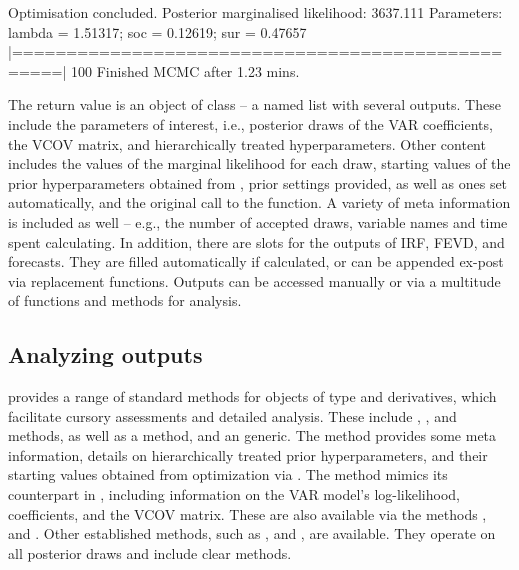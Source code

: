 \documentclass[article,nojss]{jss} %
\begin{document}
\begin{Soutput}
Optimisation concluded.
Posterior marginalised likelihood: 3637.111
Parameters: lambda = 1.51317; soc = 0.12619; sur = 0.47657
  |==================================================| 100%
Finished MCMC after 1.23 mins.
\end{Soutput}

The return value is an object of class  -- a named list with several outputs. These include the parameters of interest, i.e., posterior draws of the VAR coefficients, the VCOV matrix, and hierarchically treated hyperparameters.
Other content includes the values of the marginal likelihood for each draw, starting values of the prior hyperparameters obtained from , prior settings provided, as well as ones set automatically, and the original call to the  function.
A variety of meta information is included as well -- e.g., the number of accepted draws, variable names and time spent calculating.
In addition, there are slots for the outputs of IRF, FEVD, and forecasts. They are filled automatically if calculated, or can be appended ex-post via replacement functions.
Outputs can be accessed manually or via a multitude of functions and methods for analysis.

\subsection{Analyzing outputs}\label{subsec:assess}

 provides a range of standard methods for objects of type  and derivatives, which facilitate cursory assessments and detailed analysis. These include , , and  methods, as well as a  method, and an  generic.
The  method provides some meta information, details on hierarchically treated prior hyperparameters, and their starting values obtained from optimization via . The  method mimics its counterpart in , including information on the VAR model's log-likelihood, coefficients, and the VCOV matrix. These are also available via the methods ,  and .
Other established methods, such as ,  and , are available. They operate on all posterior draws and include clear  methods.
\end{document}
